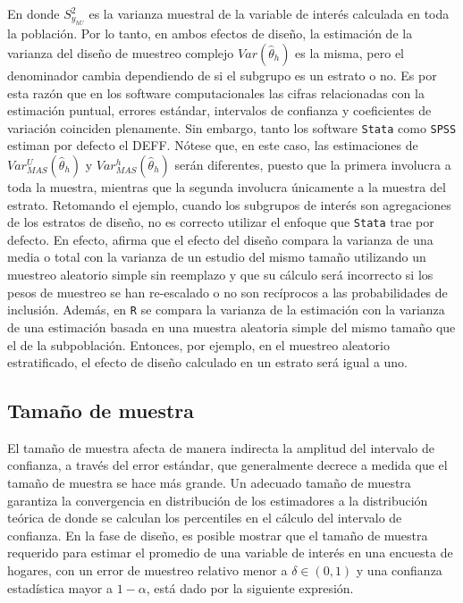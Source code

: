 \documentclass[12pt,spanish,]{book}
\begin{document}
En donde \(S_{y_{hU}}^2\) es la varianza muestral de la variable de interés calculada en toda la población. Por lo tanto, en ambos efectos de diseño, la estimación de la varianza del diseño de muestreo complejo \(Var (\hat\theta_h)\) es la misma, pero el denominador cambia dependiendo de si el subgrupo es un estrato o no. Es por esta razón que en los software computacionales las cifras relacionadas con la estimación puntual, errores estándar, intervalos de confianza y coeficientes de variación coinciden plenamente. Sin embargo, tanto los software \texttt{Stata} como \texttt{SPSS} estiman por defecto el DEFF. Nótese que, en este caso, las estimaciones de \(Var_{MAS}^U(\hat\theta_h)\) y \(Var_{MAS}^h(\hat\theta_h)\) serán diferentes, puesto que la primera involucra a toda la muestra, mientras que la segunda involucra únicamente a la muestra del estrato. Retomando el ejemplo, cuando los subgrupos de interés son agregaciones de los estratos de diseño, no es correcto utilizar el enfoque que \texttt{Stata} trae por defecto. En efecto, \textcite{Lumley_2010} afirma que el efecto del diseño compara la varianza de una media o total con la varianza de un estudio del mismo tamaño utilizando un muestreo aleatorio simple sin reemplazo y que su cálculo será incorrecto si los pesos de muestreo se han re-escalado o no son recíprocos a las probabilidades de inclusión. Además, en \texttt{R} se compara la varianza de la estimación con la varianza de una estimación basada en una muestra aleatoria simple del mismo tamaño que el de la subpoblación. Entonces, por ejemplo, en el muestreo aleatorio estratificado, el efecto de diseño calculado en un estrato será igual a uno.

\hypertarget{tamano-de-muestra-1}{%
\subsection{Tamaño de muestra}\label{tamano-de-muestra-1}}

El tamaño de muestra afecta de manera indirecta la amplitud del intervalo de confianza, a través del error estándar, que generalmente decrece a medida que el tamaño de muestra se hace más grande. Un adecuado tamaño de muestra garantiza la convergencia en distribución de los estimadores a la distribución teórica de donde se calculan los percentiles en el cálculo del intervalo de confianza. En la fase de diseño, es posible mostrar que el tamaño de muestra requerido para estimar el promedio de una variable de interés en una encuesta de hogares, con un error de muestreo relativo menor a \(\delta \in (0,1)\) y una confianza estadística mayor a \(1-\alpha\), está dado por la siguiente expresión.
\end{document}

